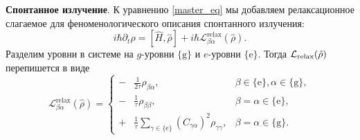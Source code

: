 

\textbf{Спонтанное излучение}. К уравнению \eqref{master_eq}  мы добавляем релаксационное слагаемое для феноменологического описания \cite{main_2006,allen_1975} спонтанного излучения:
\begin{equation*}
    i \hbar \partial_t \hat{\rho} = [\hat{H}, \hat{\rho}] + i \hbar {\mathcal L}^\text{relax}_{\beta \alpha} (\hat{\rho}) .
\end{equation*}
Разделим уровни в системе на $g$-уровни $\{\text{g}\}$  и $e$-уровни  $\{\text{e}\}$. Тогда $\mathcal L_{\textnormal{relax}} (\hat{\rho})$ перепишется в виде
\begin{equation*}
    {\mathcal L}^\text{relax}_{\beta \alpha} (\hat{\rho}) = \left\{\begin{aligned}
        - &\tfrac{1}{2\tau} \rho_{\beta \alpha}, &\beta \in \{\text{e}\}, \alpha \in \{\text{g}\}, \\
        - &\tfrac{1}{\tau} \rho_{\beta \beta}, & \beta = \alpha \in \{\text{e}\}, \\
        + &\tfrac{1}{\tau} \textstyle \sum\limits_{\gamma \in \{\text{e}\}} (C_{\gamma \alpha})^2 \rho_{\gamma \gamma},
        & \beta = \alpha \in \{\text{g}\}.
    \end{aligned}\right.
\end{equation*}

